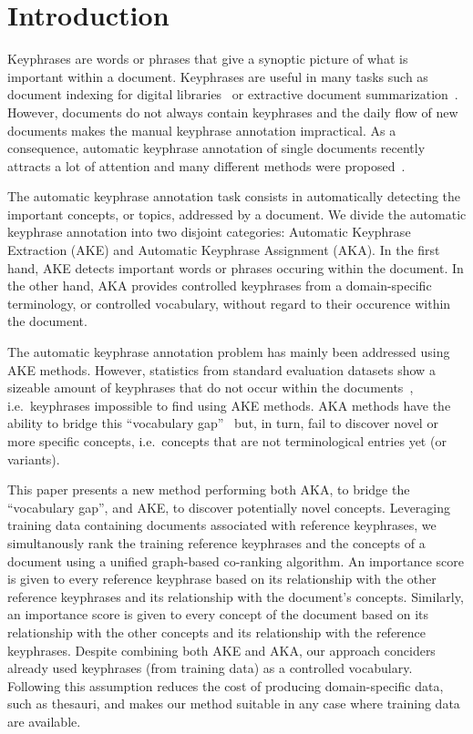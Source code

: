 \section{Introduction}
\label{sec: introduction}
  Keyphrases are words or phrases that give a synoptic picture of what is
  important within a document. Keyphrases are useful in many tasks such as
  document indexing for digital
  libraries~\cite{gutwin1999keyphrasesfordigitallibraries} or extractive
  document summarization~\cite{litvak2008graphbased}. However, documents do not
  always contain keyphrases and the daily flow of new documents makes the manual
  keyphrase annotation impractical. As a consequence, automatic keyphrase
  annotation of single documents recently attracts a lot of attention and many
  different methods were proposed~\cite{hasan2014state_of_the_art}.

  The automatic keyphrase annotation task consists in automatically detecting
  the important concepts, or topics, addressed by a document. We divide the
  automatic keyphrase annotation into two disjoint categories: Automatic
  Keyphrase Extraction (AKE) and Automatic Keyphrase Assignment (AKA). In the
  first hand, AKE detects important words or phrases occuring within the
  document. In the other hand, AKA provides controlled keyphrases from a
  domain-specific terminology, or controlled vocabulary, without regard to their
  occurence within the document.

  The automatic keyphrase annotation problem has mainly been addressed using AKE
  methods. However, statistics from standard evaluation datasets show a sizeable
  amount of keyphrases that do not occur within the
  documents~\cite{bougouin2013topicrank}, i.e.~keyphrases impossible to find
  using AKE methods. AKA methods have the ability to bridge this ``vocabulary
  gap''~\cite{liu2011vocabularygap} but, in turn, fail to discover novel or more
  specific concepts, i.e.~concepts that are not terminological entries yet (or
  variants).

  This paper presents a new method performing both AKA, to bridge the
  ``vocabulary gap'', and AKE, to discover potentially novel concepts.
  Leveraging training data containing documents associated with reference
  keyphrases, we simultanously rank the training reference keyphrases and the
  concepts of a document using a unified graph-based co-ranking algorithm. An
  importance score is given to every reference keyphrase based on its
  relationship with the other reference keyphrases and its relationship with the
  document's concepts. Similarly, an importance score is given to every concept
  of the document based on its relationship with the other concepts and its
  relationship with the reference keyphrases. Despite combining both AKE and
  AKA, our approach conciders already used keyphrases (from training data) as a
  controlled vocabulary. Following this assumption reduces the cost of producing
  domain-specific data, such as thesauri, and makes our method suitable in any
  case where training data are available.

